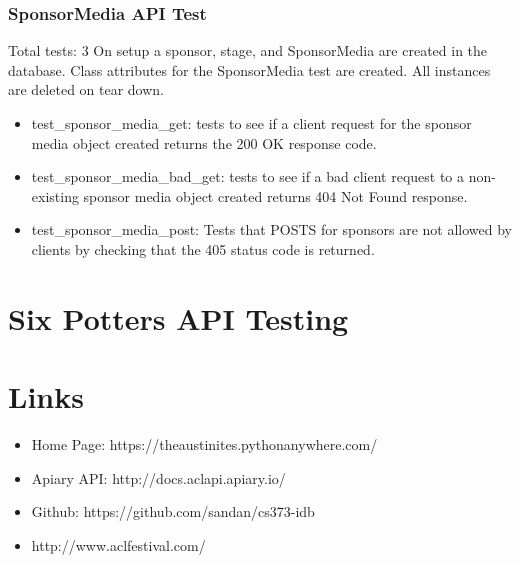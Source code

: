 \documentclass[12pt,english]{scrartcl}
\begin{document}
\subsubsection{SponsorMedia API Test} 
Total tests: 3
On setup a sponsor, stage, and SponsorMedia are created in the database. Class attributes for the SponsorMedia test are created.
All instances are deleted on tear down.
\begin{itemize}
  \item test\_sponsor\_media\_get: tests to see if a client request for the sponsor media object created returns the 200 OK response code.
 
 \item test\_sponsor\_media\_bad\_get: tests to see if a bad client request to a non-existing sponsor media object created returns 
                                     404 Not Found response.
 
 \item test\_sponsor\_media\_post: Tests that POSTS for sponsors are not allowed by clients by checking that the 405 status code is returned.
\end{itemize}


\section{Six Potters API Testing}


\section{Links}

\begin{itemize}
 \item Home Page: https://theaustinites.pythonanywhere.com/
 \item Apiary API: http://docs.aclapi.apiary.io/
 \item Github: https://github.com/sandan/cs373-idb
 \item http://www.aclfestival.com/
\end{itemize}
\end{document}
